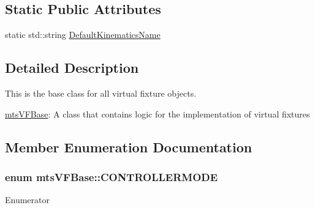 \subsection*{Static Public Attributes}
\begin{DoxyCompactItemize}
\item 
static std\+::string \hyperlink{classmts_v_f_base_a0e57cd2efaf96320f7bcceb6964cebe8}{Default\+Kinematics\+Name}
\end{DoxyCompactItemize}


\subsection{Detailed Description}
This is the base class for all virtual fixture objects. 

\hyperlink{classmts_v_f_base}{mts\+V\+F\+Base}\+: A class that contains logic for the implementation of virtual fixtures 

\subsection{Member Enumeration Documentation}
\hypertarget{classmts_v_f_base_a742dd08f8b70bafeb746cec14d9ee974}{}
\subsubsection[{C\+O\+N\+T\+R\+O\+L\+L\+E\+R\+M\+O\+D\+E}]{\setlength{\rightskip}{0pt plus 5cm}enum {\bf mts\+V\+F\+Base\+::\+C\+O\+N\+T\+R\+O\+L\+L\+E\+R\+M\+O\+D\+E}}\label{classmts_v_f_base_a742dd08f8b70bafeb746cec14d9ee974}
\begin{Desc}
\item[Enumerator]\par
\begin{description}
\item[{\em 
\hypertarget{classmts_v_f_base_a742dd08f8b70bafeb746cec14d9ee974a6639d5ab298255f1c757007f7f95a348}{}J\+P\+O\+S\label{classmts_v_f_base_a742dd08f8b70bafeb746cec14d9ee974a6639d5ab298255f1c757007f7f95a348}
}]\item[{\em 
\hypertarget{classmts_v_f_base_a742dd08f8b70bafeb746cec14d9ee974ad7f45d2df799c9b4af6977e674b69a84}{}J\+V\+E\+L\label{classmts_v_f_base_a742dd08f8b70bafeb746cec14d9ee974ad7f45d2df799c9b4af6977e674b69a84}
}]\end{description}
\end{Desc}


